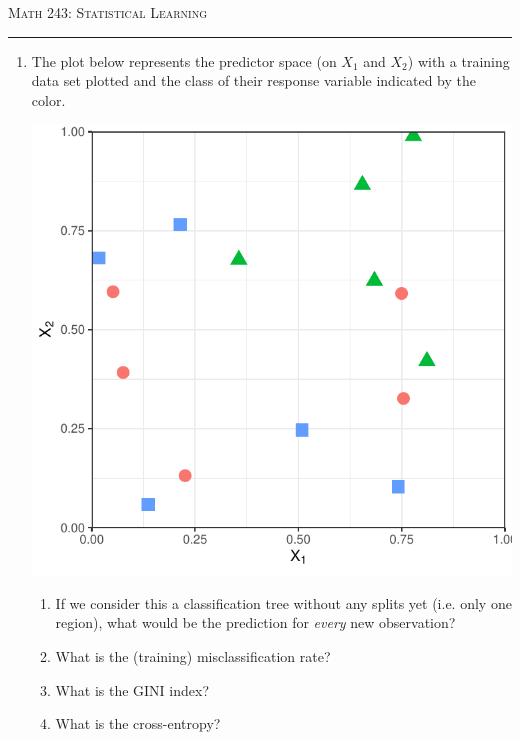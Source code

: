 \documentclass{article}\usepackage[]{graphicx}\usepackage[]{color}
\makeatletter
\def\maxwidth{ %
  \ifdim\Gin@nat@width>\linewidth
    \linewidth
  \else
    \Gin@nat@width
  \fi
}
\newenvironment{knitrout}{}{} %
\makeatother
\begin{document}
\begin{center}
\textsc{Math 243: Statistical Learning} \\
\noindent\rule{12cm}{0.4pt}
\end{center}


\begin{enumerate}
\setlength\itemsep{4em}

\item The plot below represents the predictor space (on $X_1$ and $X_2$) with a training data set plotted and the class of their response variable indicated by the color.

\begin{minipage}{.5\linewidth}

\vspace{3mm}

\begin{knitrout}
\color{fgcolor}
\includegraphics[width=\maxwidth]{figure/unnamed-chunk-1-1} 

\end{knitrout}

\end{minipage}
\begin{minipage}{.5\linewidth}

\begin{enumerate}
\setlength\itemsep{3em}
\item If we consider this a classification tree without any splits yet (i.e. only one region), what would be the prediction for \emph{every} new observation?
\item What is the (training) misclassification rate?
\item What is the GINI index?
\item What is the cross-entropy?
\end{enumerate}


\end{minipage}
\end{enumerate}
\end{document}
